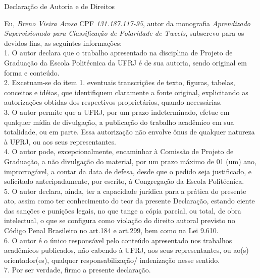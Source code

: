 \begin{center}
Declaração de Autoria e de Direitos
\end{center}

\vspace{0.5cm}

Eu, \emph{Breno Vieira Arosa} CPF \emph{131.187.117-95}, autor da monografia \emph{Aprendizado Supervisionado para Classificação de Polaridade de Tweets}, subscrevo para os devidos fins, as seguintes informações:\\
1. O autor declara que o trabalho apresentado na disciplina de Projeto de Graduação da Escola Politécnica da UFRJ é de sua autoria, sendo original em forma e conteúdo.\\
2. Excetuam-se do item 1. eventuais transcrições de texto, figuras, tabelas, conceitos e idéias, que identifiquem claramente a fonte original, explicitando as autorizações obtidas dos respectivos proprietários, quando necessárias.\\
3. O autor permite que a UFRJ, por um prazo indeterminado, efetue em qualquer mídia de divulgação, a publicação do trabalho acadêmico em sua totalidade, ou em parte. Essa autorização não envolve ônus de qualquer natureza à UFRJ, ou aos seus representantes.\\
4. O autor pode, excepcionalmente, encaminhar à Comissão de Projeto de Graduação, a não divulgação do material, por um prazo máximo de 01 (um) ano, improrrogável, a contar da data de defesa, desde que o pedido seja justificado, e solicitado antecipadamente, por escrito, à Congregação da Escola Politécnica.\\
5. O autor declara, ainda, ter a capacidade jurídica para a prática do presente ato, assim como ter conhecimento do teor da presente Declaração, estando ciente das sanções e punições legais, no que tange a cópia parcial, ou total, de obra intelectual, o que se configura como violação do direito autoral previsto no Código Penal Brasileiro no art.184 e art.299, bem como na Lei 9.610.\\
6. O autor é o único responsável pelo conteúdo apresentado nos trabalhos acadêmicos publicados, não cabendo à UFRJ, aos seus representantes,  ou ao(s) orientador(es), qualquer responsabilização/ indenização nesse sentido.\\
7. Por ser verdade, firmo a presente declaração.\\

      \vspace{0.5cm}
      \begin{flushright}
         \parbox{10cm}{
            \hrulefill

            \vspace{-.375cm}

            \vspace{0.1cm}
         }
      \end{flushright}

